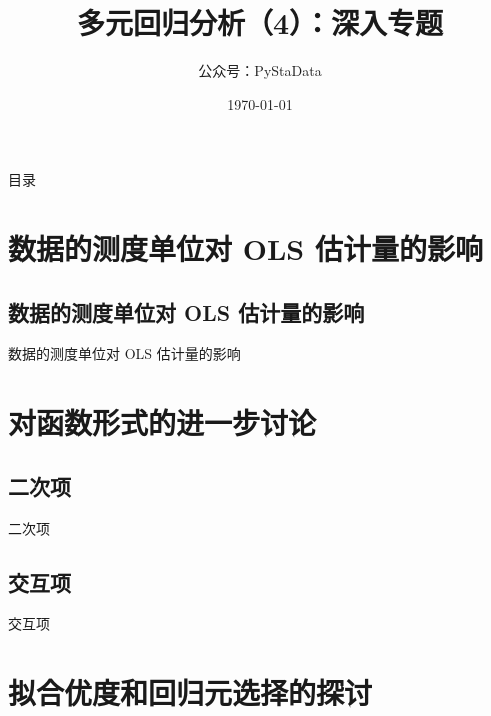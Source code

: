 \documentclass[UTF8]{ctexbeamer}
\begin{document}
\title{多元回归分析（4）：深入专题}
\author{公众号：PyStaData}
\date{\today}

\frame{\titlepage} %


\begin{frame}{目录}
\begin{multicols}{2}
  \tableofcontents
\end{multicols}
\end{frame}


\section{数据的测度单位对 OLS 估计量的影响}
\subsection{数据的测度单位对 OLS 估计量的影响}
\begin{frame}{数据的测度单位对 OLS 估计量的影响}
\end{frame}


\section{对函数形式的进一步讨论}
\subsection{二次项}
\begin{frame}{二次项}
\end{frame}

\subsection{交互项}
\begin{frame}{交互项}
\end{frame}

\section{拟合优度和回归元选择的探讨}
\end{document}
